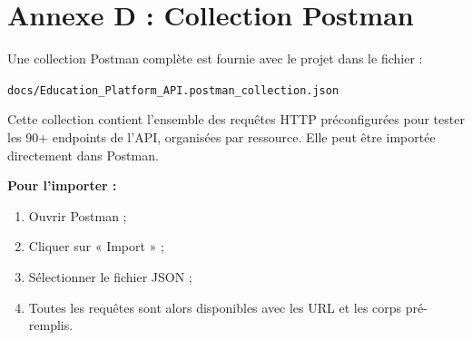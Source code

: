 \section*{Annexe D : Collection Postman}

Une collection Postman complète est fournie avec le projet dans le fichier :

\texttt{docs/Education\_Platform\_API.postman\_collection.json}

\vspace{0.3cm}

Cette collection contient l'ensemble des requêtes HTTP préconfigurées pour tester les 90+ endpoints de l'API, organisées par ressource. Elle peut être importée directement dans Postman.

\vspace{0.3cm}

\textbf{Pour l'importer :}
\begin{enumerate}[noitemsep]
    \item Ouvrir Postman ;
    \item Cliquer sur « Import » ;
    \item Sélectionner le fichier JSON ;
    \item Toutes les requêtes sont alors disponibles avec les URL et les corps pré-remplis.
\end{enumerate}

\newpage
